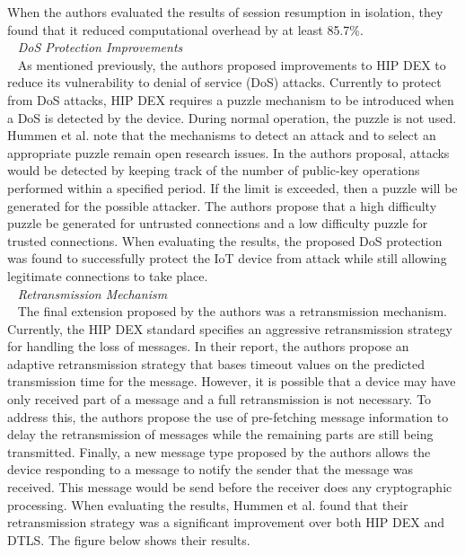 \documentclass[letterpaper, 12pt]{article}
\begin{document}
\begin{flushleft}
When the authors evaluated the results of session resumption in isolation, they found that it reduced computational overhead by at least 85.7\%. \\
~\newline
\textit{DoS Protection Improvements}\\ 
~\newline
As mentioned previously, the authors proposed improvements to HIP DEX to reduce its vulnerability to denial of service (DoS) attacks. Currently to protect
from DoS attacks, HIP DEX requires a puzzle mechanism to be introduced when a DoS is detected by the device. During normal operation, the puzzle is not used.
Hummen et al. note that the mechanisms to detect an attack and to select an appropriate puzzle remain open research issues. In the authors proposal, attacks
would be detected by keeping track of the number of public-key operations performed within a specified period. If the limit is exceeded, then a puzzle will
be generated for the possible attacker. The authors propose that a high difficulty puzzle be generated for untrusted connections and a low difficulty puzzle
for trusted connections. When evaluating the results, the proposed DoS protection was found to successfully protect the IoT device from attack while still
allowing legitimate connections to take place. \\
~\newline
\textit{Retransmission Mechanism}\\ 
~\newline
The final extension proposed by the authors was a retransmission mechanism. Currently, the HIP DEX standard specifies an aggressive retransmission strategy
for handling the loss of messages. In their report, the authors propose an adaptive retransmission strategy that bases timeout values on the 
predicted transmission time for the message. However, it is possible that a device may have only received part of a message and a full retransmission
is not necessary. To address this, the authors propose the use of pre-fetching message information to delay the retransmission of messages while the 
remaining parts are still being transmitted. Finally, a new message type proposed by the authors allows the device responding to a message to notify the
sender that the message was received. This message would be send before the receiver does any cryptographic processing. When evaluating the results, 
Hummen et al. found that their retransmission strategy was a significant improvement over both HIP DEX and DTLS. The figure below shows their results.


\end{flushleft}
\end{document}
